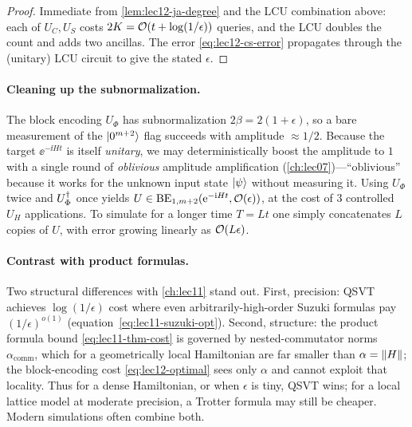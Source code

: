 \begin{proof}
Immediate from \cref{lem:lec12-ja-degree} and the LCU combination above: each of $U_C,U_S$
costs $2K=\mathcal{O}(t+\log(1/\epsilon))$ queries, and the LCU doubles the count and adds two
ancillas. The error \eqref{eq:lec12-cs-error} propagates through the (unitary) LCU circuit
to give the stated $\epsilon$.
\end{proof}

\paragraph{Cleaning up the subnormalization.}
The block encoding $U_\Phi$ has subnormalization $2\beta=2(1+\epsilon)$, so a bare
measurement of the $\ket{0^{m+2}}$ flag succeeds with amplitude $\approx1/2$. Because the
target $\ee^{-\ii Ht}$ is itself \emph{unitary}, we may deterministically boost the
amplitude to $1$ with a single round of \emph{oblivious} amplitude amplification
(\cref{ch:lec07})---``oblivious'' because it works for the unknown input state $\ket\psi$
without measuring it. Using $U_\Phi$ twice and $U_\Phi^{\dagger}$ once yields
$U\in\mathrm{BE}_{1,m+2}(\mathrm{e}^{-\mathrm{i} Ht},\mathcal{O}(\epsilon))$, at the cost of $3$ controlled
$U_H$ applications. To simulate for a longer time $T=Lt$ one simply concatenates $L$ copies
of $U$, with error growing linearly as $\mathcal{O}(L\epsilon)$.

\paragraph{Contrast with product formulas.}
Two structural differences with \cref{ch:lec11} stand out. First, precision: QSVT achieves
$\log(1/\epsilon)$ cost where even arbitrarily-high-order Suzuki formulas pay
$(1/\epsilon)^{o(1)}$ (equation~\eqref{eq:lec11-suzuki-opt}). Second, structure: the
product formula bound \eqref{eq:lec11-thm-cost} is governed by nested-commutator norms
$\alpha_{\mathrm{comm}}$, which for a geometrically local Hamiltonian are far smaller than
$\alpha=\left\lVert H \right\rVert$; the block-encoding cost \eqref{eq:lec12-optimal} sees only $\alpha$ and
cannot exploit that locality. Thus for a dense Hamiltonian, or when $\epsilon$ is tiny,
QSVT wins; for a local lattice model at moderate precision, a Trotter formula may still be
cheaper. Modern simulations often combine both.

